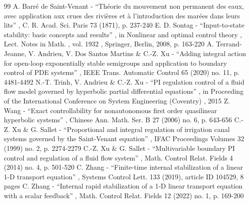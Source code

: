 \documentclass[11pt]{article}
\numberwithin{equation}{section}
\theoremstyle{definition}
\begin{document}
\begin{thebibliography}{99}
 A. Barré de Saint-Venant - “Théorie du mouvement non permanent des eaux, avec application aux crues des rivières et à l’introduction des marées dans leurs lits” , C. R. Acad. Sci. Paris 73 (1871), p. 237-240
 E. D. Sontag - “Input-to-state stability: basic concepts and results” , in Nonlinear and optimal control theory , Lect. Notes in Math. , vol. 1932 , Springer, Berlin, 2008, p. 163-220
 A. Terrand-Jeanne, V. Andrieu, V. Dos Santos Martins \& C.-Z. Xu - “Adding integral action for open-loop exponentially stable semigroups and application to boundary control of PDE systems” , IEEE Trans. Automatic Control 65 (2020) no. 11, p. 4481-4492
 N.-T. Trinh, V. Andrieu \& C.-Z. Xu - “PI regulation control of a fluid flow model governed by hyperbolic partial differential equations” , in Proceeding of the International Conference on System Engineering (Coventry) , 2015
 Z. Wang - “Exact controllability for nonautonomous first order quasilinear hyperbolic systems” , Chinese Ann. Math. Ser. B 27 (2006) no. 6, p. 643-656
 C.-Z. Xu \& G. Sallet - “Proportional and integral regulation of irrigation canal systems governed by the Saint-Venant equation” , IFAC Proceedings Volumes 32 (1999) no. 2, p. 2274-2279
 C.-Z. Xu \& G. Sallet - “Multivariable boundary PI control and regulation of a fluid flow system” , Math. Control Relat. Fields 4 (2014) no. 4, p. 501-520
 C. Zhang - “Finite-time internal stabilization of a linear 1-D transport equation” , Systems Control Lett. 133 (2019), article ID 104529, 8 pages
 C. Zhang - “Internal rapid stabilization of a 1-D linear transport equation with a scalar feedback” , Math. Control Relat. Fields 12 (2022) no. 1, p. 169-200
\end{thebibliography}
\end{document}
